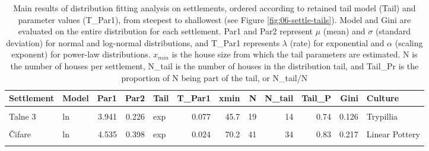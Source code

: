 \documentclass[
  12pt,
  a4paper, twoside]{book}
\begin{document}
\begin{landscape}\begin{table}

\caption[Distribution fitting results, settlements]{\label{tab:06-settle-tab}Main results of distribution fitting analysis on settlements, ordered according to retained tail model (Tail) and parameter values (T\_Par1), from steepest to shallowest (see Figure \ref{fig:06-settle-tails}). Model and Gini are evaluated on the entire distribution for each settlement. Par1 and Par2 represent \(\mu\) (mean) and \(\sigma\) (standard deviation) for normal and log-normal distributions, and T\_Par1 represents \(\lambda\) (rate) for exponential and \(\alpha\) (scaling exponent) for power-law distributions. \(x_{min}\) is the house size from which the tail parameters are estimated. N is the number of houses per settlement, N\_tail is the number of houses in the distribution tail, and Tail\_Pr is the proportion of N being part of the tail, or N\_tail/N}
\centering
\begin{tabular}[t]{llrrlrrrrrrl}
\toprule
Settlement & Model & Par1 & Par2 & Tail & T\_Par1 & xmin & N & N\_tail & Tail\_P & Gini & Culture\\
\midrule
\cellcolor{gray!6}{Úľany} & \cellcolor{gray!6}{norm} & \cellcolor{gray!6}{62.349} & \cellcolor{gray!6}{12.542} & \cellcolor{gray!6}{exp} & \cellcolor{gray!6}{0.109} & \cellcolor{gray!6}{63.6} & \cellcolor{gray!6}{34} & \cellcolor{gray!6}{17} & \cellcolor{gray!6}{0.50} & \cellcolor{gray!6}{0.113} & \cellcolor{gray!6}{Linear Pottery}\\
Talne 3 & ln & 3.941 & 0.226 & exp & 0.077 & 45.7 & 19 & 14 & 0.74 & 0.126 & Trypillia\\
\cellcolor{gray!6}{Vlkas} & \cellcolor{gray!6}{ln} & \cellcolor{gray!6}{4.534} & \cellcolor{gray!6}{0.387} & \cellcolor{gray!6}{exp} & \cellcolor{gray!6}{0.025} & \cellcolor{gray!6}{81.2} & \cellcolor{gray!6}{61} & \cellcolor{gray!6}{40} & \cellcolor{gray!6}{0.66} & \cellcolor{gray!6}{0.221} & \cellcolor{gray!6}{Linear Pottery}\\
Čifare & ln & 4.535 & 0.398 & exp & 0.024 & 70.2 & 41 & 34 & 0.83 & 0.217 & Linear Pottery\\
\cellcolor{gray!6}{Telince} & \cellcolor{gray!6}{ln} & \cellcolor{gray!6}{4.452} & \cellcolor{gray!6}{0.417} & \cellcolor{gray!6}{exp} & \cellcolor{gray!6}{0.024} & \cellcolor{gray!6}{59.3} & \cellcolor{gray!6}{13} & \cellcolor{gray!6}{12} & \cellcolor{gray!6}{0.92} & \cellcolor{gray!6}{0.228} & \cellcolor{gray!6}{Linear Pottery}\\

\end{tabular}
\end{table}
\end{landscape}
\end{document}
